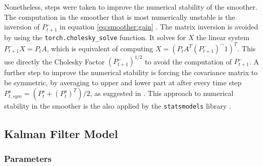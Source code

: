 \documentclass{article}
\let\Oldsubsection\subsection
\renewcommand{\subsection}{\FloatBarrier\Oldsubsection}
\begin{document}
Nonetheless, steps were taken to improve the numerical stability of the smoother. The computation in the smoother that is most numerically unstable is the inversion of $P^-_{t+1}$ in equation \ref{eq:smoother:gain} \cite{mohinder_s_grewal_kalman_2001}. The matrix inversion is avoided by using the \verb|torch.cholesky_solve| function. It solves for $X$ the linear system $P^-_{t+1}X=P_tA$, which is equivalent of computing $X = (P_tA^T(P^-_{t+1})^-1)^T$. This use directly the Cholesky Factor $(P^-_{t+1})^{1/2}$ to avoid the computation of $P^-_{t+1}$. A further step to improve the numerical stability is forcing the covariance matrix to be symmetric, by averaging to upper and lower part at after every time step $P^s_{t, sym} = (P^s_t + (P^s_t)^T)/2$, as suggested in \cite{dan_simon_optimal_2006}.
This approach to numerical stability in the smoother is the also applied by the \texttt{statsmodels} library \cite{noauthor_statsmodelstsastatespacekalman_filterkalmanfilter_nodate}.

\subsection{Kalman Filter Model}

\subsubsection{Parameters}
\end{document}
